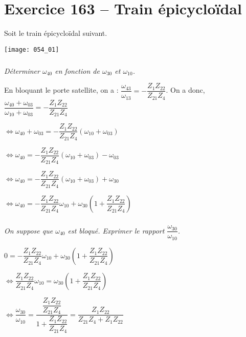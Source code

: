 \section*{Exercice 163 -- Train épicycloïdal}

\setcounter{exo}{0}

Soit le train épicycloïdal suivant. 

\begin{center}
 \texttt{[image: 054\_01]}
\end{center}





\subparagraph{}
\textit{Déterminer $\omega_{40}$ en fonction de  $\omega_{30}$ et $\omega_{10}$.}
 \ifprof
 \begin{corrige}
 
 En bloquant le porte satellite, on a : $\dfrac{\omega_{43}}{\omega_{13}}=-\dfrac{Z_{1}Z_{22}}{Z_{21}Z_{4}}$.
  On a donc, 
  $\dfrac{\omega_{40}+\omega_{03}}{\omega_{10}+\omega_{03}}=-\dfrac{Z_{1}Z_{22}}{Z_{21}Z_{4}}$

  $\Leftrightarrow \omega_{40}+\omega_{03}=-\dfrac{Z_{1}Z_{22}}{Z_{21}Z_{4}}\left( \omega_{10}+\omega_{03} \right)$
  
  $\Leftrightarrow \omega_{40}=-\dfrac{Z_{1}Z_{22}}{Z_{21}Z_{4}}\left( \omega_{10}+\omega_{03} \right)-\omega_{03}$
  
    $\Leftrightarrow \omega_{40}=-\dfrac{Z_{1}Z_{22}}{Z_{21}Z_{4}}\left( \omega_{10}+\omega_{03} \right)+\omega_{30}$
    
      $\Leftrightarrow \omega_{40}=-\dfrac{Z_{1}Z_{22}}{Z_{21}Z_{4}}\omega_{10}+\omega_{30}\left( 1+\dfrac{Z_{1}Z_{22}}{Z_{21}Z_{4}} \right)$

 \end{corrige}
 \else
 \fi




\subparagraph{}
\textit{On suppose que $\omega_{40}$ est bloqué. Exprimer le rapport $\dfrac{\omega_{30}}{\omega_{10}}$.}
\ifprof
 \begin{corrige}
$0=-\dfrac{Z_{1}Z_{22}}{Z_{21}Z_{4}}\omega_{10}+\omega_{30}\left( 1+\dfrac{Z_{1}Z_{22}}{Z_{21}Z_{4}} \right)$

$\Leftrightarrow \dfrac{Z_{1}Z_{22}}{Z_{21}Z_{4}}\omega_{10}=\omega_{30}\left( 1+\dfrac{Z_{1}Z_{22}}{Z_{21}Z_{4}} \right)$


$\Leftrightarrow \dfrac{\omega_{30}}{\omega_{10}} 
= \dfrac{\dfrac{Z_{1}Z_{22}}{Z_{21}Z_{4}}}{ 1+\dfrac{Z_{1}Z_{22}}{Z_{21}Z_{4}} }
= \dfrac{Z_{1}Z_{22}}{ Z_{21}Z_{4}+Z_{1}Z_{22} }$


 \end{corrige}
 \else
 \fi